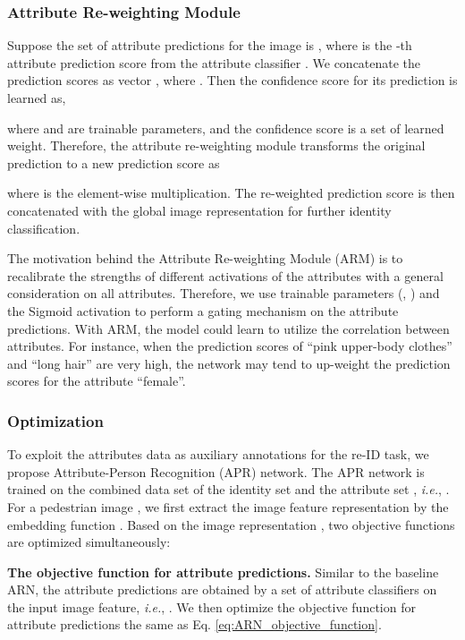 \documentclass[5p,times,twocolumn]{elsarticle}
\def\ie{\emph{i.e.}}
\begin{document}
\subsubsection{Attribute Re-weighting Module} 
Suppose the set of attribute predictions for the image  is , where  is the -th attribute prediction score from the attribute classifier . 
We concatenate the prediction scores as vector , where . Then the confidence score  for its prediction  is learned as,
{

}
\noindent
where  and  are trainable parameters, and the confidence score  is a set of learned weight. 
Therefore, the attribute re-weighting module transforms the original prediction  to a new prediction score as
{

}
\noindent
where  is the element-wise multiplication. The re-weighted prediction score  is then concatenated with the global image representation for further identity classification.



The motivation behind the Attribute Re-weighting Module (ARM) is to recalibrate the strengths of different activations of the attributes with a general consideration on all attributes.
Therefore, we use trainable parameters (, ) and the Sigmoid activation to perform a gating mechanism on the attribute predictions.
With ARM, the model could learn to utilize the correlation between attributes. For instance, when the prediction scores of ``pink upper-body clothes'' and ``long hair'' are very high, the network may tend to up-weight the prediction scores for the attribute ``female''.

    

\subsubsection{Optimization}
To exploit the attributes data  as auxiliary annotations for the re-ID task, we propose Attribute-Person Recognition (APR) network. The APR network is trained on the combined data set  of the identity set  and the attribute set , \ie, .
For a pedestrian image , we first extract the image feature representation by the embedding function . Based on the image representation , two objective functions are optimized simultaneously:

\textbf{The objective function for attribute predictions.} Similar to the baseline ARN, the attribute predictions are obtained by a set of attribute classifiers on the input image feature, \ie, . We then optimize the objective function for attribute predictions the same as Eq. \eqref{eq:ARN_objective_function}.
    
\end{document}
